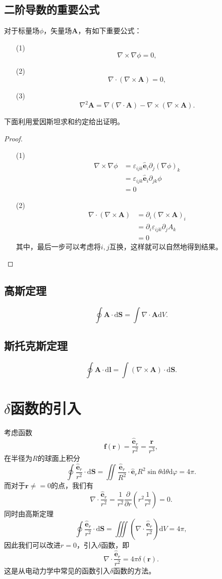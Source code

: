 \documentclass[UTF8]{ctexbook}
\renewcommand{\d}{\mathrm{d}}
\renewcommand{\b}{\boldsymbol}
\newtheorem{proof}{证明}
\numberwithin{equation}{chapter}
\begin{document}
	\subsection{二阶导数的重要公式}
	对于标量场$\phi$，矢量场$\b{A}$，有如下重要公式：
	\begin{itemize}
		\item[(1)] 
		\[\nabla \times \nabla \phi = 0,\]
		\item[(2)]
		\[\nabla\cdot (\nabla\times \b{A})=0,\]
		\item[(3)]
		\[\nabla^2 \b{A}=\nabla(\nabla\cdot\b{A})-\nabla\times(\nabla\times\b{A}).\] 
		
	\end{itemize}
	下面利用爱因斯坦求和约定给出证明。
	\begin{proof}
		\begin{itemize}
			\item[(1)] 
			\begin{align*}
				\nabla\times\nabla\phi&=\varepsilon_{ijk}\hat{\b{e}}_i\partial_j (\nabla\phi)_k \\
				&=\varepsilon_{ijk}\hat{\b{e}}_i\partial_{jk}\phi \\
				&=0
			\end{align*}
			
			\item[(2)]
			\begin{align*}
				\nabla\cdot (\nabla\times\b{A})&=\partial_i (\nabla\times\b{A})_i \\
				&=\partial_i\varepsilon_{ijk}\partial_j A_k \\
				&=0
			\end{align*}
			其中，最后一步可以考虑将$i,j$互换，这样就可以自然地得到结果。
		\end{itemize}
	\end{proof}

	\subsection{高斯定理}
	\[\oint\b{A}\cdot\d\b{S}=\int \nabla\cdot\b{A}\d V.\]
		
	\subsection{斯托克斯定理}
	\[\oint \b{A}\cdot\d\b{l}=\int(\nabla\times\b{A})\cdot\d\b{S}.\]
	
	\section{$\delta$函数的引入}
	考虑函数
	\[\b{f}(\b{r})=\frac{\hat{\b{e}}_r}{r^2}=\frac{\b{r}}{r^3},\]
	在半径为$R$的球面上积分
	\[\oint\frac{\hat{\b{e}}_r}{r^2}\cdot\d\b{S}=\iint \frac{\hat{\b{e}}_r}{R^2}\cdot\hat{\b{e}}_rR^2\sin\theta\d\theta\d\varphi = 4\pi.\]
	而对于$\b{r}\neq =0$的点，我们有
	\[\nabla\cdot\frac{\hat{\b{e}}_r}{r^2}=\frac{1}{r^2}\frac{\partial }{\partial r}\left(r^2\frac{1}{r^2}\right)=0.\]
	同时由高斯定理
	\[\oint\frac{\hat{\b{e}}_r}{r^2}\cdot\d\b{S}=\iiint\left(\nabla\cdot\frac{\hat{\b{e}}_r}{r^2}\right)\d V =4\pi,\]
	因此我们可以改进$r=0$，引入$\delta$函数，即
	\[\nabla\cdot\frac{\hat{\b{e}}_r}{r^2}=4\pi\delta(\b{r}).\]
	这是从电动力学中常见的函数引入$\delta$函数的方法。
	
\end{document}
